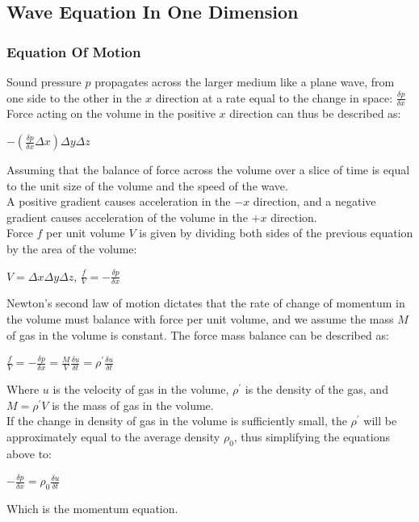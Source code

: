 \subsection{Wave Equation In One Dimension}
\subsubsection{Equation Of Motion}

Sound pressure $p$ propagates across the larger medium like a plane wave, from one side to the other in the $x$ direction at a rate equal to the change in space: $\frac{\delta p}{\delta x}$\\
Force acting on the volume in the positive $x$ direction can thus be described as:
\begin{center}
 $-(\frac{\delta p}{\delta x} \Delta x) \Delta y \Delta z$\\
\end{center}
Assuming that the balance of force across the volume over a slice of time is equal to the unit size of the volume and the speed of the wave.\\
A positive gradient causes acceleration in the $-x$ direction, and a negative gradient causes acceleration of the volume in the $+x$ direction.\\
Force $\textit{f}$ per unit volume $V$ is given by dividing both sides of the previous equation by the area of the volume:
\begin{center}
 $V = \Delta x \Delta y \Delta z$, $\frac{\textit{f}}{V} = -\frac{\delta p}{\delta x}$\\
\end{center}
Newton's second law of motion dictates that the rate of change of momentum in the volume must balance with force per unit volume, and we assume the mass $M$ of gas in the volume is constant. The force mass balance can be described as:
\begin{center}
 $\frac{\textit{f}}{V} = -\frac{\delta p}{\delta x} = \frac{M}{V} \frac{\delta u}{\delta t} = \rho^{\prime}\frac{\delta u}{\delta t}$\\ 
\end{center}
Where $u$ is the velocity of gas in the volume, $\rho^{\prime}$ is the density of the gas, and $M = \rho^{\prime} V$ is the mass of gas in the volume.\\
If the change in density of gas in the volume is sufficiently small, the $\rho^{\prime}$ will be approximately equal to the average density $\rho_0$, thus simplifying the equations above to:
\begin{center}
 $-\frac{\delta p}{\delta x} = \rho_0 \frac{\delta u}{\delta t}$\\
\end{center}
Which is the momentum equation.\\

